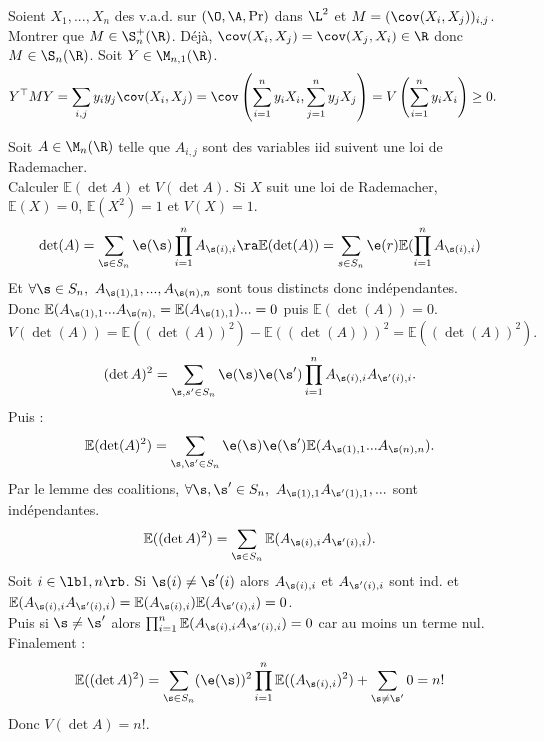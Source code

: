 \documentclass[11pt]{article}
\renewcommand*{\E}{\mathbb{E}}
\begin{document}
\begin{exercice}{}{}
    Soient $X_1,...,X_n$ des v.a.d. sur $(\O,\A,\Pr)$ dans $\L^2$ et $M=(\cov(X_i,X_j))_{i,j}$. Montrer que $M\in\S_n^+(\R)$.
    \tcblower
    Déjà, $\cov(X_i,X_j)=\cov(X_j,X_i)\in\R$ donc $M\in\S_n(\R)$. Soit $Y\in\M_{n,1}(\R)$.
    \begin{align*}
        Y^\top MY &= \sum_{i,j}y_iy_j\cov(X_i,X_j) = \cov\left(\sum_{i=1}^n y_i X_i, \sum_{j=1}^n y_j X_j \right) = V\left( \sum_{i=1}^n y_i X_i \right) \geq 0.
    \end{align*}
\end{exercice}

\begin{exercice}{}{}
    Soit $A\in\M_n(\R)$ telle que $A_{i,j}$ sont des variables iid suivent une loi de Rademacher.\\
    Calculer $\E(\det A)$ et $V(\det A)$.
    \tcblower
    Si $X$ suit une loi de Rademacher, $\E(X)=0$, $\E(X^2)=1$ et $V(X)=1$.
    \begin{equation*}
        \det(A) = \sum_{\s\in S_n}\e(\s)\prod_{i=1}^n A_{\s(i),i} \ra \E(\det(A)) = \sum_{s\in S_n}\e(r)\E(\prod_{i=1}^nA_{\s(i),i})
    \end{equation*}
    Et $\forall \s \in S_n, ~ A_{\s(1),1},...,A_{\s(n),n}$ sont tous distincts donc indépendantes.\\
    Donc $\E(A_{\s(1),1}...A_{\s(n),}=\E(A_{\s(1),1})...= 0$ puis $\E(\det(A))=0$.
    \begin{equation*}
        V(\det(A))=\E((\det(A))^2) - \E((\det(A)))^2 = \E((\det(A))^2).
    \end{equation*}
    \begin{equation*}
        (\det A)^2 = \sum_{\s,s' \in S_n}\e(\s)\e(\s')\prod_{i=1}^n A_{\s(i),i}A_{\s'(i),i}.
    \end{equation*}
    Puis :
    \begin{equation*}
        \E(\det(A)^2) = \sum_{\s,\s' \in S_n} \e(\s)\e(\s') \E(A_{\s(1),1}... A_{\s(n),n}).
    \end{equation*}
    Par le lemme des coalitions, $\forall \s,\s'\in S_n, ~ A_{\s(1),1}A_{\s'(1),1}, ...$ sont indépendantes.
    \begin{equation*}
        \E((\det A)^2) = \sum_{\s \in S_n} \E(A_{\s(i),i} A_{\s'(i),i}).
    \end{equation*}
    Soit $i\in\lb1,n\rb$. Si $\s(i)\neq\s'(i)$ alors $A_{\s(i),i}$ et $A_{\s'(i),i}$ sont ind. et $\E(A_{\s(i),i}A_{\s'(i),i})=\E(A_{\s(i),i})\E(A_{\s'(i),i})=0$.\\
    Puis si $\s\neq \s'$ alors $\prod_{i=1}^n\E(A_{\s(i),i}A_{\s'(i),i}) = 0$ car au moins un terme nul. Finalement :
    \begin{equation*}
        \E((\det A)^2) = \sum_{\s \in S_n}(\e(\s))^2 \prod_{i=1}^n \E((A_{\s(i),i})^2) + \sum_{\s \neq \s'}0 = n!
    \end{equation*}
    Donc $V(\det A) = n!$.
\end{exercice}
\end{document}
